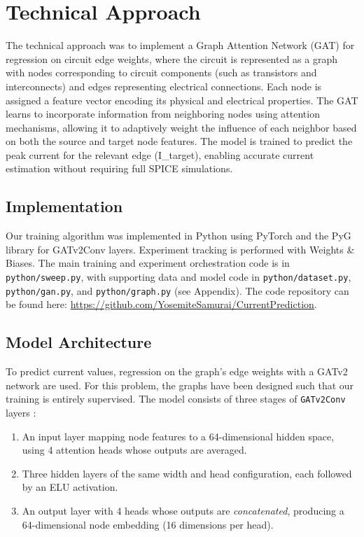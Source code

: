 \documentclass[10pt,twocolumn,letterpaper]{article}
\begin{document}
\section{Technical Approach}
\label{sec:tech_approach}

The technical approach was to implement a Graph Attention Network (GAT) for regression on circuit edge weights, where the circuit is represented as a graph with nodes corresponding to circuit components (such as transistors and interconnects) and edges representing electrical connections. Each node is assigned a feature vector encoding its physical and electrical properties. The GAT learns to incorporate information from neighboring nodes using attention mechanisms, allowing it to adaptively weight the influence of each neighbor based on both the source and target node features. The model is trained to predict the peak current for the relevant edge (I\_target), enabling accurate current estimation without requiring full SPICE simulations.

\subsection{Implementation}
\label{subsec:implementation}

Our training algorithm was implemented in Python using PyTorch and the PyG library \cite{PyG_Documentation} for GATv2Conv layers. Experiment tracking is performed with Weights \& Biases. The main training and experiment orchestration code is in \texttt{python/sweep.py}, with supporting data and model code in \texttt{python/dataset.py}, \texttt{python/gan.py}, and \texttt{python/graph.py} (see Appendix). The code repository can be found here: \url{https://github.com/YosemiteSamurai/CurrentPrediction}.

\subsection{Model Architecture}
\label{subsec:model_architecture}

To predict current values, regression on the graph's edge weights with a GATv2 network \cite{brody2022how} are used. For this problem, the graphs have been designed such that our training is entirely supervised. The model consists of three stages of \texttt{GATv2Conv} layers \cite{PyG_Documentation}:\\

\begin{enumerate}[nosep]
  \item An input layer mapping node features to a 64-dimensional hidden space, using 4 attention heads whose outputs are averaged.
  \item Three hidden layers of the same width and head configuration, each followed by an ELU activation.
  \item An output layer with 4 heads whose outputs are \emph{concatenated}, producing a 64-dimensional node embedding (16 dimensions per head).\\
\end{enumerate}
\end{document}
